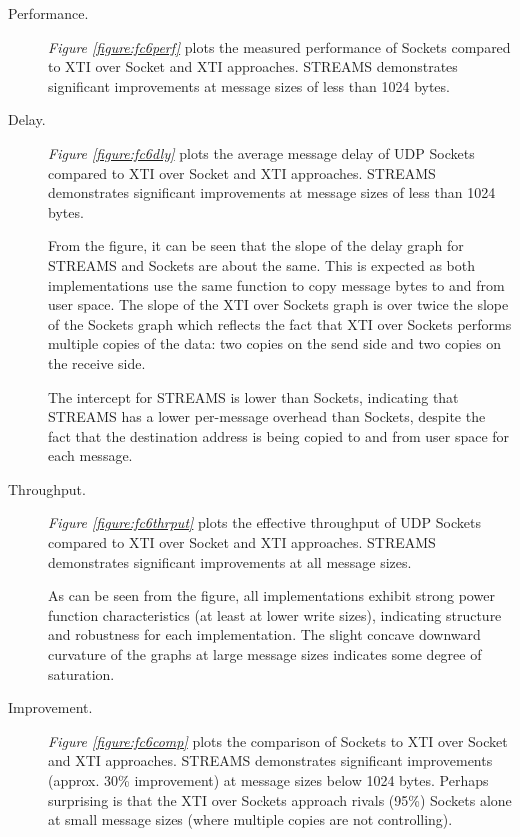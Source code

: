 \documentclass[letterpaper,final,notitlepage,twocolumn,10pt,twoside]{article}
\begin{document}
\begin{description}

\item[Performance.]

\textit{Figure \ref{figure:fc6perf}}
plots the measured performance of Sockets compared to XTI over Socket and XTI approaches.  STREAMS
demonstrates significant improvements at message sizes of less than 1024 bytes.

\item[Delay.]

\textit{Figure \ref{figure:fc6dly}}
plots the average message delay of UDP Sockets compared to XTI over Socket and XTI approaches.
STREAMS demonstrates significant improvements at message sizes of less than 1024 bytes.

From the figure, it can be seen that the slope of the delay graph for STREAMS and Sockets are about
the same.  This is expected as both implementations use the same function to copy message bytes to
and from user space.  The slope of the XTI over Sockets graph is over twice the slope of the Sockets
graph which reflects the fact that XTI over Sockets performs multiple copies of the data: two copies
on the send side and two copies on the receive side.

The intercept for STREAMS is lower than Sockets, indicating that STREAMS has a lower per-message
overhead than Sockets, despite the fact that the destination address is being copied to and from
user space for each message.

\item[Throughput.]

\textit{Figure \ref{figure:fc6thrput}}
plots the effective throughput of UDP Sockets compared to XTI over Socket and XTI approaches.
STREAMS demonstrates significant improvements at all message sizes.

As can be seen from the figure, all implementations exhibit strong power function characteristics
(at least at lower write sizes), indicating structure and robustness for each implementation.  The
slight concave downward curvature of the graphs at large message sizes indicates some degree of
saturation.

\item[Improvement.]

\textit{Figure \ref{figure:fc6comp}}
plots the comparison of Sockets to XTI over Socket and XTI approaches.  STREAMS demonstrates
significant improvements (approx. 30\% improvement) at message sizes below 1024 bytes.  Perhaps
surprising is that the XTI over Sockets approach rivals (95\%) Sockets alone at small message sizes
(where multiple copies are not controlling).

\end{description}
\end{document}
